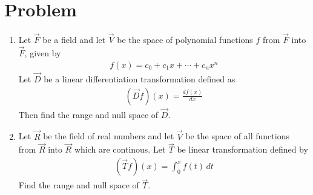 \documentclass[journal,12pt,twocolumn]{IEEEtran}
\begin{document}
\section{Problem}
\begin{enumerate}[label=\emph{\alph*)}]
\item
Let $\vec{F}$ be a field and let $\vec{V}$ be the space of polynomial functions $f$ from $\vec{F}$
into $\vec{F}$, given by
\begin{align*}
	f(x)=c_0+c_1x+\cdots +c_nx^n
\end{align*}
Let $\vec{D}$ be a linear differentiation transformation defined as
\begin{align*}
	(\vec{D}f)(x)=\frac{df(x)}{dx}
\end{align*}
Then find the range and null space of 
$\vec{D}$.\\
\item
Let $\vec{R}$ be the field of real numbers and let $\vec{V}$ be the space of all functions from 
$\vec{R}$ into $\vec{R}$ which are continous. Let $\vec{T}$ be linear transformation defined by
\begin{align*}
	(\vec{T}f)(x)=\int_{0}^{x} f(t)\,dt
\end{align*}
Find the range and null space of $\vec{T}$.
\end{enumerate}
\end{document}
